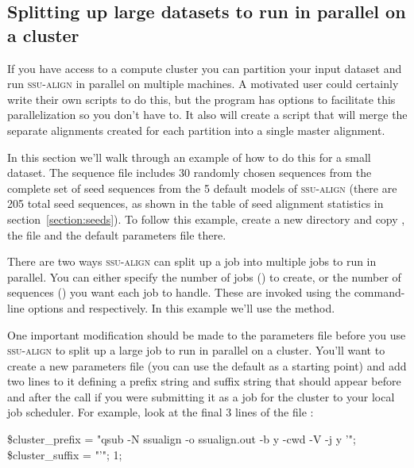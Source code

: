 \subsection{Splitting up large datasets to run in parallel on a cluster}

If you have access to a compute cluster you can partition your input
dataset and run \textsc{ssu-align} in parallel on multiple machines. A
motivated user could certainly write their own scripts to do this, but
the  program has options to facilitate this
parallelization so you don't have to.  It also will create a script
that will merge the separate alignments created for each partition
into a single master alignment.

In this section we'll walk through an example of how to do this for a
small dataset.  The sequence file  includes
30 randomly chosen sequences from the complete set of seed sequences
from the 5 default models of \textsc{ssu-align} (there are 205 total
seed sequences, as shown in the table of seed alignment statistics in
section~\ref{section:seeds}). To follow this example, create a new
directory and copy , the file
 and the default parameters file
 there.

There are two ways \textsc{ssu-align} can split up a job into multiple
jobs to run in parallel. You can either specify the number of jobs
() to create, or the number of sequences () you
want each job to handle. These are invoked using the command-line
options  and  respectively.  In this example
we'll use the  method.

One important modification should be made to the parameters file
before you use \textsc{ssu-align} to split up a large job to run in
parallel on a cluster. You'll want to create a new parameters file
(you can use the default  as a starting point) and
add two lines to it defining a prefix string and suffix string that
should appear before and after the  call if you were
submitting it as a job for the cluster to your local job
scheduler. For example, look at the final 3 lines of the file
:

\begin{sreoutput}
\$cluster_prefix = "qsub -N ssualign -o ssualign.out -b y -cwd -V -j y '";
\$cluster_suffix = "'";
1;
\end{sreoutput}

